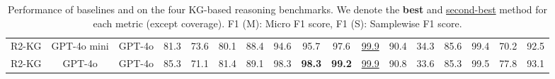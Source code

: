 \begin{table*}[tb]
{\begin{tabular}{@{}c|c|c|cccc|cccc|cccc|cc@{}}
            R2-KG & GPT-4o mini & GPT-4o    
                                                 &  81.3 & 73.6 & 80.1 & 88.4
                                                 &  94.6 & 95.7 & 97.6 & \underline{99.9}
                                                 &  90.4 & 34.3 & 85.6 & 99.4
                                                 &  70.2 & 92.5 \\

            R2-KG & GPT-4o & GPT-4o
                                                 &  85.3 & 71.1 & 81.4 & 89.1
                                                 &  98.3 & \textbf{98.3} & \textbf{99.2} & \underline{99.9}
                                                 &  90.8 & 33.6 & 85.3 & 99.5
                                                 &  77.8 & 93.1 \\
                                                 
            \bottomrule
        \end{tabular}%
        }
        
    \caption{Performance of baselines and \modelname on the four KG-based reasoning benchmarks. We denote the \textbf{best} and \underline{second-best} method for each metric (except coverage). 
    F1 (M): Micro F1 score, F1 (S): Samplewise F1 score.
    }
    \label{tab:2agent_Operator_result}
\end{table*}%